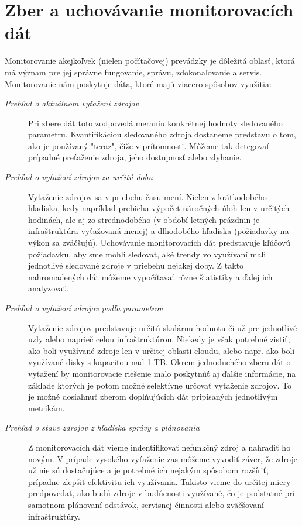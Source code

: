 \documentclass[printed,11pt,twoside,color,cover,table]{fithesis3}
\begin{document}
\chapter{Zber a uchovávanie monitorovacích dát}
Monitorovanie akejkoľvek (nielen počítačovej) prevádzky je dôležitá oblasť, ktorá má význam pre jej správne fungovanie, správu, zdokonaľovanie a servis. Monitorovanie nám poskytuje dáta, ktoré majú viacero 
spôsobov využitia:
\begin{description}
\item[\emph{Prehľad o aktuálnom vyťažení zdrojov}]
Pri zbere dát toto zodpovedá meraniu konkrétnej hodnoty sledovaného parametru. Kvantifikáciou sledovaného zdroja dostaneme predstavu o tom, ako je používaný "teraz", čiže v prítomnosti. Môžeme tak detegovať 
prípadné preťaženie zdroja, jeho dostupnosť alebo zlyhanie.
\item[\emph{Prehľad o vyťažení zdrojov za určitú dobu}]
Vyťaženie zdrojov sa v priebehu času mení. Nielen z krátkodobého hľadiska, kedy napríklad prebieha výpočet náročných úloh len v určitých hodinách, ale aj zo strednodobého (v období letných prázdnin je 
infraštruktúra vyťažovaná menej) a dlhodobého hľadiska (požiadavky na výkon sa zväčšujú). Uchovávanie monitorovacích dát predstavuje kľúčovú požiadavku, aby sme mohli sledovať, aké trendy vo využívaní mali 
jednotlivé sledované zdroje v priebehu nejakej doby. Z takto nahromadených dát môžeme vypočítavať rôzne štatistiky a ďalej ich analyzovať.
\item[\emph{Prehľad o vyťažení zdrojov podľa parametrov}]
Vyťaženie zdrojov predstavuje určitú skalárnu hodnotu či už pre jednotlivé uzly alebo naprieč celou infraštruktúrou. Niekedy je však potrebné zistiť, ako boli využívané zdroje len v určitej oblasti cloudu,
alebo napr. ako boli využívané disky s kapacitou nad 1 TB. Okrem jednoduchého zberu dát o vyťažení by monitorovacie riešenie malo poskytnúť aj ďalšie informácie, na základe ktorých je potom možné
selektívne určovať vyťaženie zdrojov. To je možné dosiahnuť zberom doplňujúcich dát pripísaných jednotlivým metrikám.
\item[\emph{Prehľad o stave zdrojov z hľadiska správy a plánovania}]
Z monitorovacích dát vieme indentifikovať nefunkčný zdroj a nahradiť ho novým. V prípade vysokého vyťaženie zas môžeme vyvodiť záver, že zdroje už nie sú
dostačujúce a je potrebné ich nejakým spôsobom rozšíriť, prípadne zlepšiť efektivitu ich využívania. Takisto vieme do určitej miery predpovedať, ako budú zdroje v budúcnosti využívané, 
čo je podstatné pri samotnom plánovaní odstávok, servisnej činnosti alebo zväčšovaní infraštruktúry.


\end{description}
\end{document}
